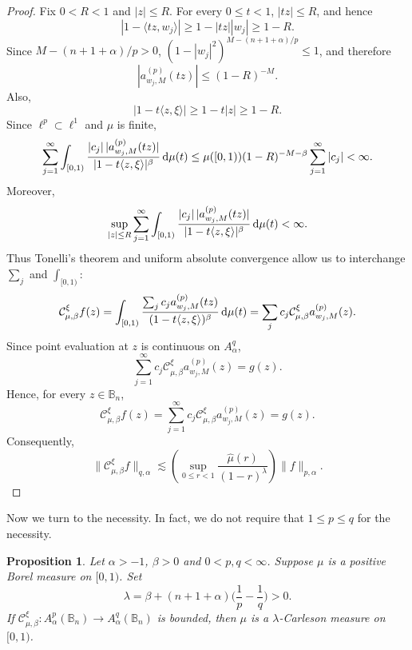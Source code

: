 \documentclass[preprint,12pt,times]{elsarticle}
\newtheorem{proposition}[theorem]{Proposition}
\theoremstyle{definition}
\theoremstyle{remark}
\numberwithin{equation}{section}
\begin{document}
\begin{proof}
Fix \(0<R<1\) and \(|z|\le R\). For every \(0\le t<1\),
\(|tz|\le R\), and hence
\[
  |1-\langle tz,w_j\rangle|
  \ge1-|tz||w_j|
  \ge1-R.
\]
Since \(M-(n+1+\alpha)/p>0\),
\((1-|w_j|^2)^{M-(n+1+\alpha)/p}\le1\), and therefore
\[
  |a_{w_j,M}^{(p)}(tz)|\le(1-R)^{-M}.
\]
Also,
\[
  |1-t\langle z,\xi\rangle|\ge1-t|z|\ge1-R.
\]
Since \(\ell^p\subset\ell^1\) and \(\mu\) is finite,
\[
  \sum_{j=1}^\infty\int_{[0,1)}\frac{|c_j|\,|a_{w_j,M}^{(p)}(tz)|}{|1-t\langle z,\xi\rangle|^\beta}\,{\rm d}\mu(t)
  \le \mu([0,1))(1-R)^{-M-\beta}\sum_{j=1}^\infty|c_j|<\infty.
\]
Moreover,
\[
  \sup_{|z|\le R}\sum_{j=1}^\infty\int_{[0,1)}\frac{|c_j|\,|a_{w_j,M}^{(p)}(tz)|}{|1-t\langle z,\xi\rangle|^\beta}\,{\rm d}\mu(t)<\infty.
\]
Thus Tonelli's theorem and uniform absolute convergence allow us to interchange
\(\sum_j\) and \(\int_{[0,1)}\):
\[
  \mathcal C_{\mu,\beta}^{\xi}f(z)=\int_{[0,1)}\frac{\sum_jc_ja_{w_j,M}^{(p)}(tz)}{(1-t\langle z,\xi\rangle)^\beta}\,{\rm d}\mu(t)
  =\sum_jc_j\mathcal C_{\mu,\beta}^{\xi}a_{w_j,M}^{(p)}(z).
\]
Since point evaluation at \(z\) is continuous on \(A_\alpha^q\),
\[
  \sum_{j=1}^\infty c_j\mathcal C_{\mu,\beta}^{\xi}a_{w_j,M}^{(p)}(z)=g(z).
\]
Hence, for every \(z\in\mathbb B_n\),
\[
  \mathcal C_{\mu,\beta}^{\xi}f(z)=\sum_{j=1}^\infty c_j\mathcal C_{\mu,\beta}^{\xi}a_{w_j,M}^{(p)}(z)=g(z).
\]
Consequently,
\[
  \|\mathcal C_{\mu,\beta}^{\xi}f\|_{q,\alpha}
  \lesssim
  \left(\sup_{0\le r<1}\frac{\widehat\mu(r)}{(1-r)^\lambda}\right)\|f\|_{p,\alpha}.
\]

\end{proof}

 Now we turn to the necessity. In fact, we do not require that $1\leq p\leq q$ for the necessity.
\begin{proposition}  \label{proposition3.6}
  Let $\alpha>-1$, $\beta>0$ and $0<p,q<\infty$. Suppose $\mu$ is a positive Borel measure on $[0,1)$. Set 
\[
    \lambda=\beta+(n+1+\alpha)\Big(\frac{1}{p}-\frac{1}{q}\Big)>0.
\]
If $\mathcal{C}_{\mu,\beta}^{\xi}: A_{\alpha}^p(\mathbb{B}_n)\to A_{\alpha}^q(\mathbb{B}_n)$ is bounded, then $\mu$ is a $\lambda$-Carleson measure on $[0,1)$.
\end{proposition}
\end{document}
